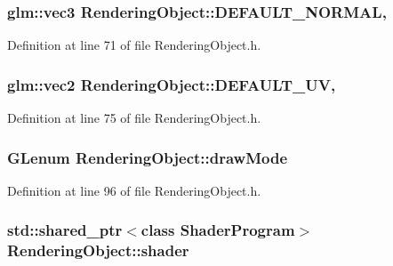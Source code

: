 \subsubsection[{D\+E\+F\+A\+U\+L\+T\+\_\+\+N\+O\+R\+M\+A\+L}]{\setlength{\rightskip}{0pt plus 5cm}glm\+::vec3 Rendering\+Object\+::\+D\+E\+F\+A\+U\+L\+T\+\_\+\+N\+O\+R\+M\+A\+L\hspace{0.3cm}{\ttfamily [static]}, {\ttfamily [protected]}}\label{class_rendering_object_af270a476ba12c23fefbb034e21930add}


Definition at line 71 of file Rendering\+Object.\+h.

\hypertarget{class_rendering_object_a3dcb28a12f578630aea75cc59ea39588}{}
\subsubsection[{D\+E\+F\+A\+U\+L\+T\+\_\+\+U\+V}]{\setlength{\rightskip}{0pt plus 5cm}glm\+::vec2 Rendering\+Object\+::\+D\+E\+F\+A\+U\+L\+T\+\_\+\+U\+V\hspace{0.3cm}{\ttfamily [static]}, {\ttfamily [protected]}}\label{class_rendering_object_a3dcb28a12f578630aea75cc59ea39588}


Definition at line 75 of file Rendering\+Object.\+h.

\hypertarget{class_rendering_object_aa67856a72705b54a5667e91e270d00b3}{}
\subsubsection[{draw\+Mode}]{\setlength{\rightskip}{0pt plus 5cm}G\+Lenum Rendering\+Object\+::draw\+Mode\hspace{0.3cm}{\ttfamily [protected]}}\label{class_rendering_object_aa67856a72705b54a5667e91e270d00b3}


Definition at line 96 of file Rendering\+Object.\+h.

\hypertarget{class_rendering_object_ae50e545ce2008ffa802478cd4316e82e}{}
\subsubsection[{shader}]{\setlength{\rightskip}{0pt plus 5cm}std\+::shared\+\_\+ptr$<$class {\bf Shader\+Program}$>$ Rendering\+Object\+::shader\hspace{0.3cm}{\ttfamily [protected]}}\label{class_rendering_object_ae50e545ce2008ffa802478cd4316e82e}


